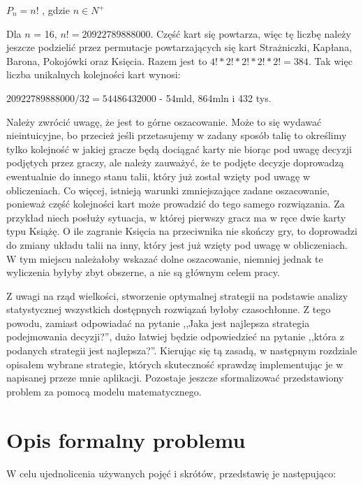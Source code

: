 \begin{center}
	$P_n = n!$ , gdzie $n\in N^+$
\end{center}

Dla  $n$ = 16, $n!=20 922 789 888 000$. Część kart się powtarza, więc tę liczbę należy jeszcze podzielić przez permutacje powtarzających się kart Strażniczki, Kapłana, Barona, Pokojówki oraz Księcia. Razem jest to $4! * 2! * 2! * 2! * 2! =  384$. Tak więc liczba unikalnych kolejności kart wynosi: 

\begin{center}
	$20 922 789 888 000 / 32 = 54486432000$ - 54mld, 864mln i 432 tys.
\end{center}

Należy zwrócić uwagę, że jest to górne oszacowanie. Może to się wydawać nieintuicyjne, bo przecież jeśli przetasujemy w zadany sposób talię to określimy tylko kolejność w jakiej gracze będą dociągać karty nie biorąc pod uwagę decyzji podjętych przez graczy, ale należy zauważyć, że te podjęte decyzje doprowadzą ewentualnie do innego stanu talii, który już został wzięty pod uwagę w obliczeniach. Co więcej, istnieją warunki zmniejszające zadane oszacowanie, ponieważ część kolejności kart może prowadzić do tego samego rozwiązania. Za przykład niech posłuży sytuacja, w której pierwszy gracz ma w ręce dwie karty typu Książę. O ile zagranie Księcia na przeciwnika nie skończy gry, to doprowadzi do zmiany układu talii na inny, który jest już wzięty pod uwagę w obliczeniach. W tym miejscu należałoby wskazać dolne oszacowanie, niemniej jednak te wyliczenia byłyby zbyt obszerne, a nie są głównym celem pracy.

Z uwagi na rząd wielkości, stworzenie optymalnej strategii na podstawie analizy statystycznej wszystkich dostępnych rozwiązań byłoby czasochłonne. Z tego powodu, zamiast odpowiadać na pytanie ,,Jaka jest najlepsza strategia podejmowania decyzji?'', dużo łatwiej będzie odpowiedzieć na pytanie ,,która z podanych strategii jest najlepsza?''. Kierując się tą zasadą, w następnym rozdziale opisałem wybrane strategie, których skuteczność sprawdzę implementując je w napisanej przeze mnie aplikacji. Pozostaje jeszcze sformalizować przedstawiony problem za pomocą modelu matematycznego.


\section{Opis formalny problemu}
W celu ujednolicenia używanych pojęć i skrótów, przedstawię je następująco:

